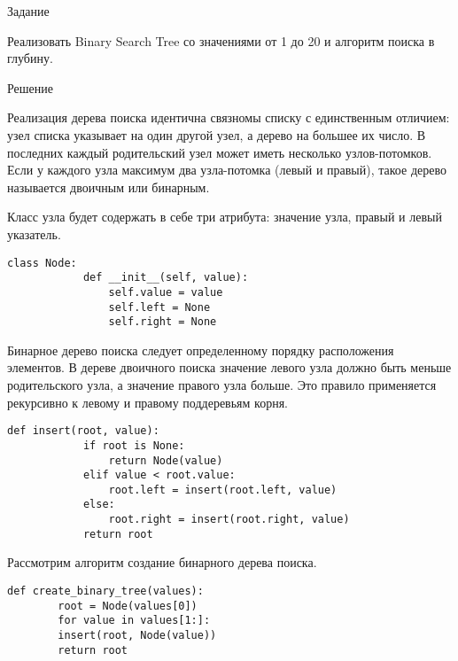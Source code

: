 \documentclass[oneside,14pt]{extarticle} %
\begin{document}
\begin{titlepage}
\begin{flushleft}
		\end{flushleft}
		\vfill
		\begin{center}
			
			\fontsize{12}{12}\selectfont{Старый Оскол, \yeardate\today}
			
		\end{center}
			
	\end{titlepage}
	\setcounter{page}{2}
	
	\begin{center}
		Задание
	\end{center}
	
	Реализовать Binary Search Tree со значениями от 1 до 20 и алгоритм поиска в глубину.
	
	\begin{center}
		Решение
	\end{center}
	
	Реализация дерева поиска идентична связномы списку с единственным отличием: узел списка указывает на один другой узел, а дерево на большее их число. В последних каждый родительский узел может иметь несколько узлов-потомков. Если у каждого узла максимум два узла-потомка (левый и правый), такое дерево называется двоичным или бинарным.
	
	Класс узла будет содержать в себе три атрибута: значение узла, правый и левый указатель.
	
	\begin{lstlisting}[caption={Реализация узла дерева поиска}]
		class Node:
			def __init__(self, value):
				self.value = value
				self.left = None
				self.right = None
	\end{lstlisting}
	
	Бинарное дерево поиска следует определенному порядку расположения элементов. В дереве двоичного поиска значение левого узла должно быть меньше родительского узла, а значение правого узла больше. Это правило применяется рекурсивно к левому и правому поддеревьям корня.
	
	\begin{lstlisting}[caption={Вставка элемента в бинарное дерево}]
		def insert(root, value):
			if root is None:
				return Node(value)
			elif value < root.value:
				root.left = insert(root.left, value)
			else:
				root.right = insert(root.right, value)
			return root
	\end{lstlisting}
	
	Рассмотрим алгоритм создание бинарного дерева поиска.
	
	\begin{lstlisting}[caption={Алгоритм создания BST}]
		def create_binary_tree(values):
		root = Node(values[0])
		for value in values[1:]:
		insert(root, Node(value))
		return root
	\end{lstlisting}
	
\end{document}
